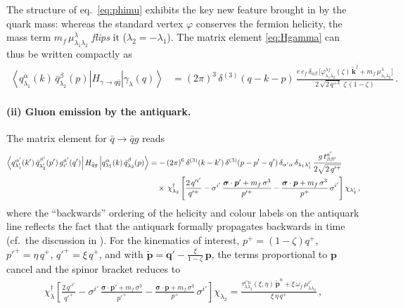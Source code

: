 \documentclass[11pt,a4paper]{article}
\newcommand{\ket}[1]{\left|#1\right\rangle}
\newcommand{\bra}[1]{\left\langle#1\right|}
\newcommand{\vp}{\bm{p}}
\newcommand{\vq}{\bm{q}}
\newcommand{\kt}{\widetilde{\bm{k}}}
\newcommand{\pt}{\widetilde{\bm{p}}}
\numberwithin{equation}{section}
\begin{document}
The structure of eq.~\eqref{eq:phimu} exhibits the key new feature brought in by the quark
mass: whereas the standard vertex $\varphi$ conserves the fermion helicity, the mass term
$m_f\,\mu^{\lambda}_{\lambda_1\lambda_2}$ \emph{flips} it ($\lambda_2=-\lambda_1$). The matrix
element \eqref{eq:Hgamma} can thus be written compactly as
\begin{align}
\label{eq:Hgammafinal}
\bra{q^{\alpha}_{\lambda_{1}}(k)\,\bar{q}^{\beta}_{\lambda_{2}}(p)}H_{\gamma\rightarrow q\bar{q}}
\ket{\gamma_{\lambda}(q)} & = (2\pi)^{3}\, \delta^{(3)}(q-k-p)\,
\frac{e\,e_{f}\,\delta_{\alpha\beta}\,
\Big[\varphi^{\lambda j}_{\lambda_1\lambda_2}(\zeta)\,\kt^{j}
+m_{f}\,\mu^{\lambda}_{\lambda_{1}\lambda_{2}}\Big]}{2\,\sqrt{2\,q^{+3}}\;\zeta\,(1-\zeta)}\,.
\end{align}

\paragraph{(ii) Gluon emission by the antiquark.} The matrix element for $\bar q\to\bar q g$
reads
\begin{align}
\label{eq:Hqbarg}
\bra{q^{\alpha'}_{\lambda'_{1}}(k')\,\bar{q}^{\beta'}_{\lambda'_{2}}(p')\,g^{a'}_{i'}(q')}
H_{\bar{q}g}\ket{q^{\alpha}_{\lambda_{1}}(k)\,\bar{q}^{\beta}_{\lambda_{2}}(p)} & =
-\,(2\pi)^{6}\, \delta^{(3)}(k-k')\, \delta^{(3)}(p-p'-q')\,\delta_{\alpha'\alpha}\,
\delta_{\lambda_{1}\lambda'_{1}}\, \frac{g\,t^{a'}_{\beta\beta'}}{2\sqrt{2\,q'^{+}}} \notag \\
&\quad \times\,\chi^{\dagger}_{\lambda_{2}}\left[\frac{2\,q'^{i'}}{q'^{+}}
-\sigma^{i'}\,\frac{\bm\sigma\cdot \vp' +m_{f}\,\sigma^{3}}{p'^{+}}
-\frac{\bm\sigma\cdot \vp +m_{f}\,\sigma^{3}}{p^{+}}\,\sigma^{i'}\right]\chi_{\lambda'_{2}}\,,
\end{align}
where the ``backwards'' ordering of the helicity and colour labels on the antiquark line
reflects the fact that the antiquark formally propagates backwards in time (cf.\ the discussion
in \cite{Iancu:2022gpw}). For the kinematics of interest, $p^{+} = (1-\zeta)q^{+}$,
$p'^{+} = \eta\,q^{+}$, $q'^{+} = \xi\,q^{+}$, and with $\pt = \vq' - \frac{\xi}{1-\zeta}\,\vp$,
the terms proportional to $\vp$ cancel and the spinor bracket reduces to
\begin{align}
\label{eq:gluonreduced}
\chi^{\dagger}_{\lambda}\left[\frac{2\,q'^{i'}}{q'^{+}}
-\sigma^{i'}\,\frac{\bm\sigma\cdot \vp' +m_{f}\,\sigma^{3}}{p'^{+}}
-\frac{\bm\sigma\cdot \vp +m_{f}\,\sigma^{3}}{p^{+}}\,\sigma^{i'}\right]\chi_{\lambda_{2}}
= \frac{\tau^{i'n}_{\lambda\lambda_{2}}(\xi,\eta)\,\pt^{n}
+\xi\,\omega_{f}\,\mu^{i'}_{\lambda\lambda_{2}}}{\xi\,\eta\,q^{+}}\,,
\end{align}
\end{document}
